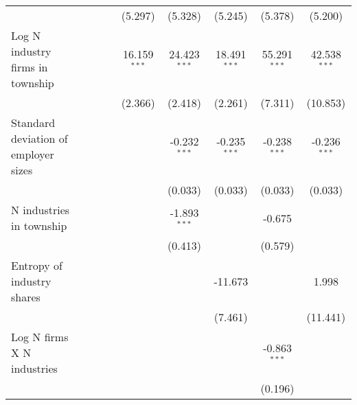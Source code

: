 \begin{tabular}{lcccccccc}
                                                         &                  &                 &                  & (5.297)          & (5.328)          & (5.245)          & (5.378)          & (5.200)\\   
   Log N industry firms in township                      &                  &                 &                  & 16.159$^{***}$   & 24.423$^{***}$   & 18.491$^{***}$   & 55.291$^{***}$   & 42.538$^{***}$\\   
                                                         &                  &                 &                  & (2.366)          & (2.418)          & (2.261)          & (7.311)          & (10.853)\\   
   Standard deviation of employer sizes                  &                  &                 &                  &                  & -0.232$^{***}$   & -0.235$^{***}$   & -0.238$^{***}$   & -0.236$^{***}$\\   
                                                         &                  &                 &                  &                  & (0.033)          & (0.033)          & (0.033)          & (0.033)\\   
   N industries in township                              &                  &                 &                  &                  & -1.893$^{***}$   &                  & -0.675           &   \\   
                                                         &                  &                 &                  &                  & (0.413)          &                  & (0.579)          &   \\   
   Entropy of industry shares                            &                  &                 &                  &                  &                  & -11.673          &                  & 1.998\\   
                                                         &                  &                 &                  &                  &                  & (7.461)          &                  & (11.441)\\   
   Log N firms X N industries                            &                  &                 &                  &                  &                  &                  & -0.863$^{***}$   &   \\   
                                                         &                  &                 &                  &                  &                  &                  & (0.196)          &   \\   

\end{tabular}
